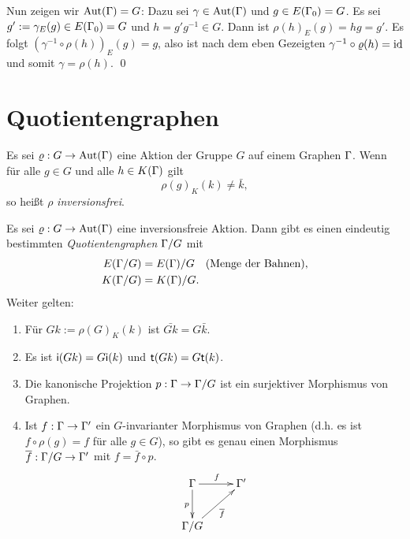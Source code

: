Nun zeigen wir $\mathrm{Aut}(\Gamma)=G$: Dazu sei $\gamma\in\mathrm{Aut}(\Gamma)$ und
$g\in E(\Gamma_0)=G$. Es sei $g':=\gamma_E(g)\in E(\Gamma_0)=G$
und $h=g'g^{-1}\in G$. Dann ist $\rho(h)_E(g)=hg=g'$.
Es folgt $(\gamma^{-1}\circ\rho(h))_E(g)=g$, also
ist nach dem eben Gezeigten $\gamma^{-1}\circ\varrho(h)=\mathrm{id}$ und somit
$\gamma=\rho(h)$.
\qed

\section{Quotientengraphen}\label{sec_qg}

\DEF Es sei $\varrho:G\rightarrow\mathrm{Aut}(\Gamma)$ eine Aktion der Gruppe $G$ auf einem
Graphen $\Gamma$. Wenn für alle $g\in G$ und alle $h\in K(\Gamma)$ gilt
\[
\rho(g)_K(k) \neq \bar{k},
\]
so heißt $\rho$ \emph{inversionsfrei}.

\DB Es sei $\varrho:G\rightarrow\mathrm{Aut}(\Gamma)$ eine inversionsfreie Aktion.
Dann gibt es einen eindeutig bestimmten
\emph{Quotientengraphen}
$\Gamma/G$ mit
\begin{align*}
E(\Gamma/G) &= E(\Gamma)/G \quad\text{(Menge der Bahnen)},\\
K(\Gamma/G) &= K(\Gamma)/G.
\end{align*}
Weiter gelten:
\begin{enumerate}
\item Für $Gk:=\rho(G)_K(k)$ ist $\bar{Gk}=G\bar{k}$.
\item Es ist $\mathsf{i}(Gk)=G \mathsf{i}(k)$ und $\mathsf{t}(Gk)=G\mathsf{t}(k)$.
\item Die kanonische Projektion
	$p:\Gamma\rightarrow\Gamma/G$ ist ein surjektiver Morphismus von Graphen.
\item Ist $f:\Gamma\rightarrow\Gamma'$ ein $G$-invarianter Morphismus von
Graphen (d.h. es ist $f\circ\rho(g)=f$ für alle $g\in G$),
so gibt es genau einen Morphismus
$\overline{f}:\Gamma/G\rightarrow \Gamma'$ mit $f=\bar{f}\circ p$.
\[\xymatrix{
\GR \ar[r]^{f} \ar[d]_{p} & \GR' \\
\GR/G \ar[ru]_{\bar{f}} &
}\]
\end{enumerate}

